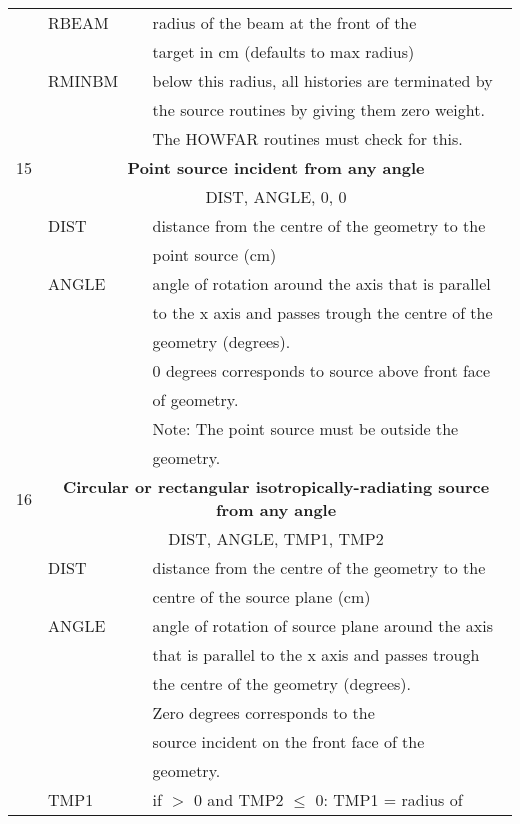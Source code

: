 \begin{longtable}{lll}
  & RBEAM   &  radius of the beam at the front of the \\
  &         &  target in cm (defaults to max radius)\\
  & RMINBM  &  below this radius, all histories are terminated by\\
  &         &  the source routines by giving them zero weight. \\
  &         &  The HOWFAR routines must check for this.\\
\hline
15&\multicolumn{2}{c}{\bf Point source incident from any angle}\\
  &\multicolumn{2}{c}{DIST, ANGLE, 0, 0}\\
  & DIST    &  distance from the centre of the geometry to the\\
  &         &  point source (cm)\\
  & ANGLE   &  angle of rotation around the axis that is parallel \\
  &         &  to the x axis and passes trough the centre of the \\
  &         &  geometry (degrees).\\
  &         &  0 degrees corresponds to source above front face\\
  &         &  of geometry.\\
  &         &  Note: The point source must be outside the\\
  &         &  geometry.\\
\hline
16&\multicolumn{2}{c}{\bf Circular or rectangular isotropically-radiating source from any angle}\\
  &\multicolumn{2}{c}{DIST, ANGLE, TMP1, TMP2}\\
  & DIST    & distance from the centre of the geometry to the\\
  &         & centre of the source plane (cm)\\
  & ANGLE   & angle of rotation of source plane around the axis \\
  &         & that is parallel to the x axis and passes trough \\
  &         & the centre of the geometry (degrees). \\
  &         & Zero degrees corresponds to the\\
  &         & source incident on the front face of the\\
  &         & geometry.\\
  & TMP1    & if $>$ 0 and TMP2 $\leq$ 0: TMP1 = radius of\\

\end{longtable}
